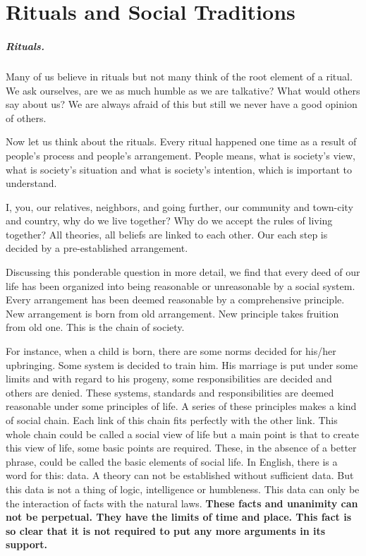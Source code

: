 \chapter{Rituals and Social Traditions}

\paragraph{Rituals.} Many of us believe in rituals but not many think of the
root element of a ritual. We ask ourselves, are we as much humble as
we are talkative? What would others say about us? We are always afraid of this
but still we never have a good opinion of others.

Now let us think about the rituals. Every ritual happened one time as a result
of people's process and people's arrangement. People means, what is society's
view, what is society's situation and what is society's intention, which is
important to understand.

I, you, our relatives, neighbors, and going further, our community and
town-city and country, why do we live together? Why do we accept the rules of
living together? All theories, all beliefs are linked to each other. Our each
step is decided by a pre-established arrangement.

Discussing this ponderable question in more detail, we find that every deed of
our life has been organized into being reasonable or unreasonable by a social system.
Every arrangement has been deemed reasonable by a comprehensive principle. New
arrangement is born from old arrangement. New principle takes fruition from old
one. This is the chain of society. 

For instance, when a child is born, there are some norms decided for his/her
upbringing. Some system is decided to train him. His marriage is put under some
limits and with regard to his progeny, some responsibilities are decided and
others are denied. These systems, standards and responsibilities are
deemed reasonable under some principles of life. A series of these principles
makes a kind of social chain. Each link of this chain fits perfectly with the
other link. This whole chain could be called a social view of life but a main
point is that to create this view of life, some basic points are required.
These, in the absence of a better phrase, could be called the basic elements of
social life. In English, there is a word for this: data. A theory can not be
established without sufficient data. But this data is not a thing of logic,
intelligence or humbleness. This data can only be the interaction of facts with
the natural laws. \textbf{These facts and unanimity can not be perpetual. They
have the limits of time and place. This fact is so clear that it is not required
to put any more arguments in its support.}

